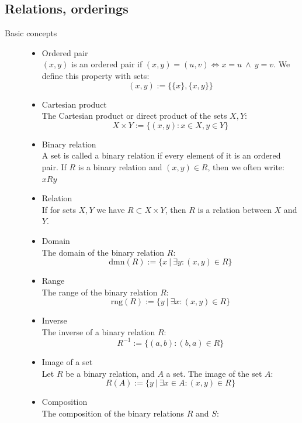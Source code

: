 \documentclass[margin=0px]{article}
\begin{document}
\subsection{Relations, orderings}
\begin{description}
    \item[Basic concepts] \hfill
        \begin{itemize}
            \item Ordered pair \\
                  $(x,y)$ is an ordered pair if $(x,y) = (u,v) \Longleftrightarrow x = u \ \land \ y = v$. We define this property with sets:
                  \[ (x,y) := \{ \{x\}, \{x, y\} \} \]
            \item Cartesian product \\
                  The Cartesian product or direct product of the sets $X,Y$:
                  \[ X \times Y := \{ (x,y) : x \in X, y \in Y \} \]
            \item Binary relation \\
                  A set is called a binary relation if every element of it is an ordered pair.
                  If $R$ is a binary relation and $(x,y) \in R$, then we often write: $xRy$
            \item Relation \\
                  If for sets $X,Y$ we have $R \subset X\times Y$, then $R$ is a relation between $X$ and $Y$.
            \item Domain \\
                  The domain of the binary relation $R$:
                  \[ \textrm{dmn}(R) := \{ x\  | \ \exists y : (x,y)\in R  \}\]
            \item Range \\
                  The range of the binary relation $R$:
                  \[ \textrm{rng}(R) := \{ y\  | \ \exists x : (x,y)\in R  \}\]
            \item Inverse \\
                  The inverse of a binary relation $R$:
                  \[R^{-1} := \{(a,b) : (b,a) \in R\} \]
            \item Image of a set \\
                  Let $R$ be a binary relation, and $A$ a set. The image of the set $A$:
                  \[R(A) := \{y \ | \ \exists x\in A: (x,y) \in R\} \]
            \item Composition \\
                  The composition of the binary relations $R$ and $S$:

\end{itemize}
\end{description}
\end{document}
